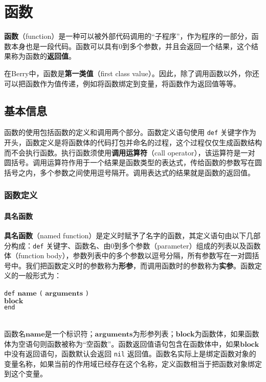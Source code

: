 \chapter{函数}

\textbf{函数}（function）是一种可以被外部代码调用的“子程序”，作为程序的一部分，函数本身也是一段代码。函数可以具有0到多个参数，并且会返回一个结果，这个结果称为函数的\textbf{返回值}。

在Berry中，函数是\textbf{第一类值}（first class value）。因此，除了调用函数以外，你还可以把函数作为值传递，例如将函数绑定到变量，将函数作为返回值等等。

\section{基本信息}

函数的使用包括函数的定义和调用两个部分。函数定义语句使用 \texttt{def} 关键字作为开头，函数定义是将函数体的代码打包并命名的过程，这个过程仅仅生成函数结构而不会执行函数。执行函数须使用\textbf{调用运算符}（call operator），该运算符是一对圆括号。调用运算符作用于一个结果是函数类型的表达式，传给函数的参数写在圆括号之内，多个参数之间使用逗号隔开。调用表达式的结果就是函数的返回值。

\subsection{函数定义}

\subsubsection{具名函数}

\textbf{具名函数}（named function）是定义时赋予了名字的函数，其定义语句由以下几部分构成：\texttt{def} 关键字、函数名、由0到多个参数（parameter）组成的列表以及函数体（function body），参数列表中的多个参数以逗号分隔，所有参数写在一对圆括号中。我们把函数定义时的参数称为\textbf{形参}，而调用函数时的参数称为\textbf{实参}。函数定义的一般形式为：
\begin{algorithm}
    \texttt{def} $\bm{name}$ \texttt{(} $\bm{arguments}$ \texttt{)} \\
        \qquad $\bm{block}$ \\
    \texttt{end}
\end{algorithm}\vspace{-0.6em}\\
函数名$\bm{name}$是一个标识符；$\bm{arguments}$为形参列表；$\bm{block}$为函数体，如果函数体为空语句则函数被称为“空函数”。函数返回值语句包含在函数体中，如果$\bm{block}$中没有返回语句，函数默认会返回 \texttt{nil} 返回值。函数名实际上是绑定函数对象的变量名称，如果当前的作用域已经存在这个名称，定义函数相当于把函数对象绑定到这个变量。

